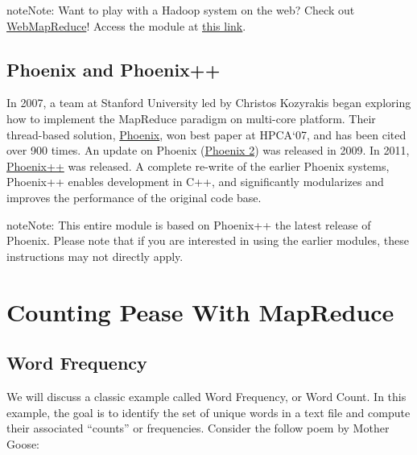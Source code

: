 \documentclass[letterpaper,10pt,openany,oneside]{sphinxmanual}
\begin{document}
\begin{notice}{note}{Note:}
Want to play with a Hadoop system on the web? Check out \href{http://csinparallel.org/csinparallel/modules/IntroWMR.html}{WebMapReduce}!
Access the module at \href{http://csinparallel.org/csinparallel/modules/IntroWMR.html}{this link}.
\end{notice}


\section{Phoenix and Phoenix++}
\label{MRIntro/MRIntro:phoenix-and-phoenix}
In 2007, a team at Stanford University led by Christos Kozyrakis began
exploring how to implement the MapReduce paradigm on multi-core platform. Their
thread-based solution, \href{http://csl.stanford.edu/~christos/publications/2007.cmp\_mapreduce.hpca.pdf}{Phoenix},
won best paper at HPCA`07, and has been cited over 900 times. An update on Phoenix (\href{http://csl.stanford.edu/~christos/publications/2009.scalable\_phoenix.iiswc.pdf}{Phoenix 2})
was released in 2009. In 2011, \href{https://research.tableau.com/sites/default/files/mapreduce2011-talbot-phoenixplusplus.pdf}{Phoenix++} was released.
A complete re-write of the earlier Phoenix systems, Phoenix++ enables
development in C++, and significantly modularizes and improves the
performance of the original code base.

\begin{notice}{note}{Note:}
This entire module is based on Phoenix++ the latest release of
Phoenix. Please note that if you are interested in using the earlier
modules, these instructions may not directly apply.
\end{notice}


\chapter{Counting Pease With MapReduce}
\label{wordcount/wordcount:counting-pease-with-mapreduce}\label{wordcount/wordcount::doc}

\section{Word Frequency}
\label{wordcount/wordcount:word-frequency}
We will discuss a classic example called Word Frequency, or Word Count. In this
example, the goal is to identify the set of unique words in a text file and
compute their associated ``counts'' or frequencies. Consider the follow poem by
Mother Goose:
\end{document}
